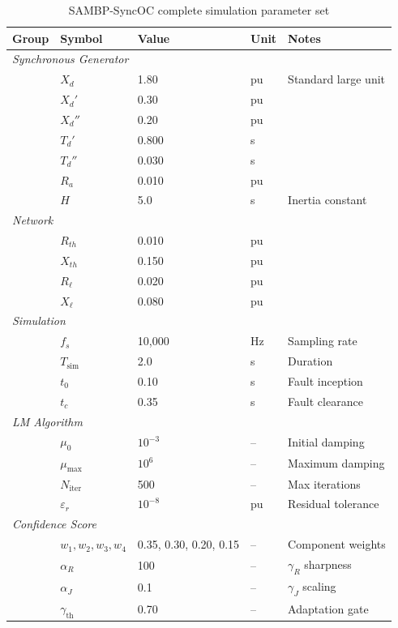 \begin{table}[htbp]
\caption{SAMBP-SyncOC complete simulation parameter set}
\label{tab:app_syncoc_params}
\small
\begin{tabularx}{\textwidth}{@{}lllll@{}}
\toprule
Group & Symbol & Value & Unit & Notes \\
\midrule
\multicolumn{5}{l}{\textit{Synchronous Generator}} \\
& $X_d$ & 1.80 & pu & Standard large unit \\
& $X_d'$ & 0.30 & pu & \\
& $X_d''$ & 0.20 & pu & \\
& $T_d'$ & 0.800 & s & \\
& $T_d''$ & 0.030 & s & \\
& $R_a$ & 0.010 & pu & \\
& $H$ & 5.0 & s & Inertia constant \\
\midrule
\multicolumn{5}{l}{\textit{Network}} \\
& $R_{th}$ & 0.010 & pu & \\
& $X_{th}$ & 0.150 & pu & \\
& $R_\ell$ & 0.020 & pu & \\
& $X_\ell$ & 0.080 & pu & \\
\midrule
\multicolumn{5}{l}{\textit{Simulation}} \\
& $f_s$ & 10{,}000 & Hz & Sampling rate \\
& $T_\mathrm{sim}$ & 2.0 & s & Duration \\
& $t_0$ & 0.10 & s & Fault inception \\
& $t_c$ & 0.35 & s & Fault clearance \\
\midrule
\multicolumn{5}{l}{\textit{LM Algorithm}} \\
& $\mu_0$ & $10^{-3}$ & -- & Initial damping \\
& $\mu_\mathrm{max}$ & $10^{6}$ & -- & Maximum damping \\
& $N_\mathrm{iter}$ & 500 & -- & Max iterations \\
& $\varepsilon_r$ & $10^{-8}$ & pu & Residual tolerance \\
\midrule
\multicolumn{5}{l}{\textit{Confidence Score}} \\
& $w_1, w_2, w_3, w_4$ & 0.35, 0.30, 0.20, 0.15 & -- & Component weights \\
& $\alpha_R$ & 100 & -- & $\gamma_R$ sharpness \\
& $\alpha_J$ & 0.1 & -- & $\gamma_J$ scaling \\
& $\gamma_\mathrm{th}$ & 0.70 & -- & Adaptation gate \\
\bottomrule
\end{tabularx}
\end{table}

